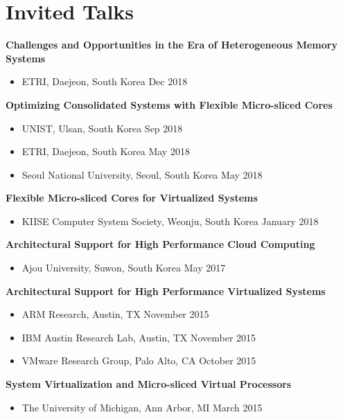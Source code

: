 \section*{Invited Talks}
\begin{description}
    \item \textbf{Challenges and Opportunities in the Era of Heterogeneous Memory Systems}
      \begin{itemize}
         \item ETRI, Daejeon, South Korea \dotfill Dec 2018
      \end{itemize}

    \item \textbf{Optimizing Consolidated Systems with Flexible Micro-sliced Cores}
      \begin{itemize}
         \item UNIST, Ulsan, South Korea \dotfill Sep 2018
         \item ETRI, Daejeon, South Korea \dotfill May 2018
         \item Seoul National University, Seoul, South Korea \dotfill May 2018
      \end{itemize}

    \item \textbf{Flexible Micro-sliced Cores for Virtualized Systems}
      \begin{itemize}
         \item KIISE Computer System Society, Weonju, South Korea \dotfill January 2018
      \end{itemize}

    \item \textbf{Architectural Support for High Performance Cloud Computing} 
      \begin{itemize}
          \item Ajou University, Suwon, South Korea \dotfill May 2017
      \end{itemize}

    \item \textbf{Architectural Support for High Performance Virtualized Systems} 
      \begin{itemize}
          \item ARM Research, Austin, TX \dotfill November 2015
          \item IBM Austin Research Lab, Austin, TX \dotfill November 2015
          \item VMware Research Group, Palo Alto, CA \dotfill October 2015 
      \end{itemize}
      
    \item \textbf{System Virtualization and Micro-sliced Virtual Processors}
      \begin{itemize}
          \item The University of Michigan, Ann Arbor, MI \dotfill March 2015
      \end{itemize}
\end{description}
